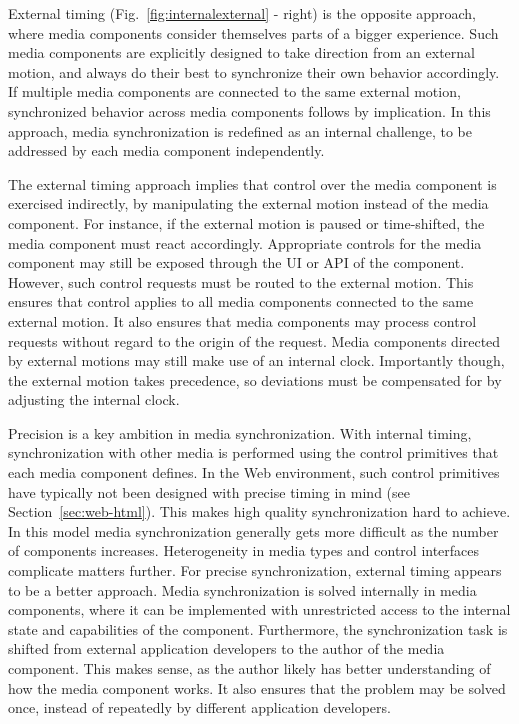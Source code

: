 \documentclass[graybox]{svmult}
\begin{document}
External timing (Fig.~\ref{fig:internalexternal} - right) is the opposite
approach, where media components consider themselves parts of a bigger
experience. Such media components are explicitly designed to take direction
from an external motion, and always do their best to synchronize their own
behavior accordingly. If multiple media components are connected to the same
external motion, synchronized behavior across media components follows by
implication. In this approach, media synchronization is redefined as an
internal challenge, to be addressed by each media component independently.



The external timing approach implies that control over the media component is
exercised indirectly, by manipulating the external motion instead of the media
component. For instance, if the external motion is paused or time-shifted, the
media component must react accordingly. Appropriate controls for the media
component may still be exposed through the UI or API of the component.
However, such control requests must be routed to the external motion. This
ensures that control applies to all media components connected to the same
external motion. It also ensures that media components may process control
requests without regard to the origin of the request. Media
components directed by external motions may still make use of an internal
clock. Importantly though, the external motion takes precedence, so deviations
must be compensated for by adjusting the internal clock.


Precision is a key ambition in media synchronization. With internal timing,
synchronization with other media is performed using the control primitives
that each media component defines. In the Web environment, such control
primitives have typically not been designed with precise timing in mind  (see
Section~\ref{sec:web-html}).  This makes high quality synchronization hard to
achieve. In this model media synchronization generally gets more difficult as
the number of components increases. Heterogeneity in media types and control
interfaces complicate matters further. For precise synchronization, external
timing appears to be a better approach. Media synchronization is solved
internally in media components, where it can be implemented with unrestricted
access to the internal state and capabilities of the component. Furthermore,
the synchronization task is shifted from external application developers to
the author of the media component. This makes sense, as the author likely has
better understanding of how the media component works. It also ensures that
the problem may be solved once, instead of repeatedly by different application
developers.
\end{document}
